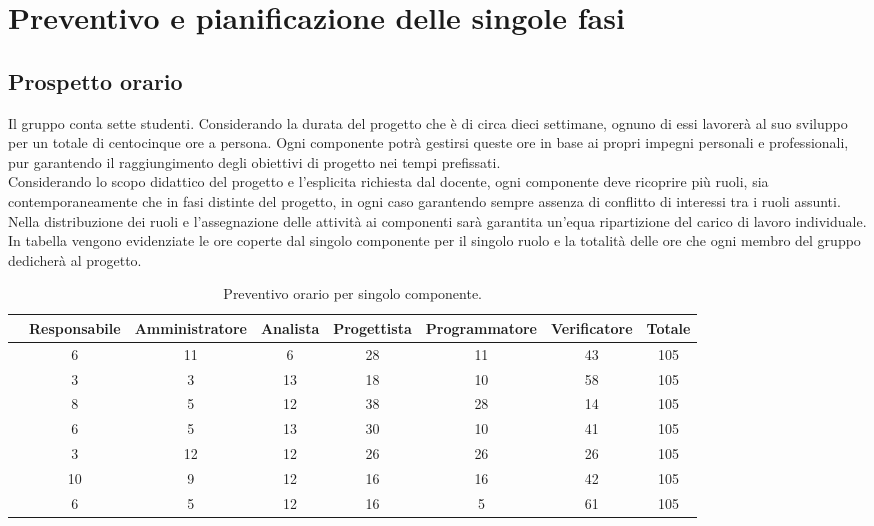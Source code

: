 \section{Preventivo e pianificazione delle singole fasi}{
	\subsection{Prospetto orario}{
		\label{RRRRR}
		Il gruppo conta sette studenti. Considerando la durata del progetto che è di circa dieci settimane, ognuno di essi lavorerà al suo sviluppo per un totale di centocinque ore a persona. Ogni componente potrà gestirsi queste ore in base ai propri impegni personali e professionali, pur garantendo il raggiungimento degli obiettivi di progetto nei tempi prefissati.\\
Considerando lo scopo didattico del progetto e l'esplicita richiesta dal docente, ogni componente deve ricoprire più ruoli, sia contemporaneamente che in fasi distinte del progetto, in ogni caso garantendo sempre assenza di conflitto di interessi tra i ruoli assunti. Nella distribuzione dei ruoli e l'assegnazione delle attività ai componenti sarà garantita un'equa ripartizione del carico di lavoro individuale.
In tabella vengono evidenziate le ore coperte dal singolo componente per il singolo ruolo e la totalità delle ore che ogni membro del gruppo dedicherà al progetto.

\begin{table}[h!]
		\scriptsize
		\begin{center}
			\begin{tabular}{l c c c c c c c}				
				\toprule
				&	Responsabile & Amministratore & Analista & Progettista & Programmatore & Verificatore & \textbf{Totale}\\ 
				\midrule
				\BM	& 6	& 11& 6  & 28 & 11 & 43 & 105\\ 
				\BA	& 3	& 3	& 13 & 18  & 10 & 58  & 105\\
				\CD	& 8	& 5	& 12 & 38 &28 & 14  & 105\\ 
				\LS	& 6	& 5	& 13 & 30  &10 & 41  & 105\\
				\PV & 3	& 12	& 12 & 26 &26 & 26  & 105\\
				\ZF & 10	& 9	& 12 & 16  &16 & 42  & 105\\
				\ZE & 6	& 5	& 12 & 16  &5	 & 61  & 105\\
				\bottomrule
			\end{tabular}
		\end{center}	
		\caption{Preventivo orario per singolo componente.}
\end{table}	


}}
